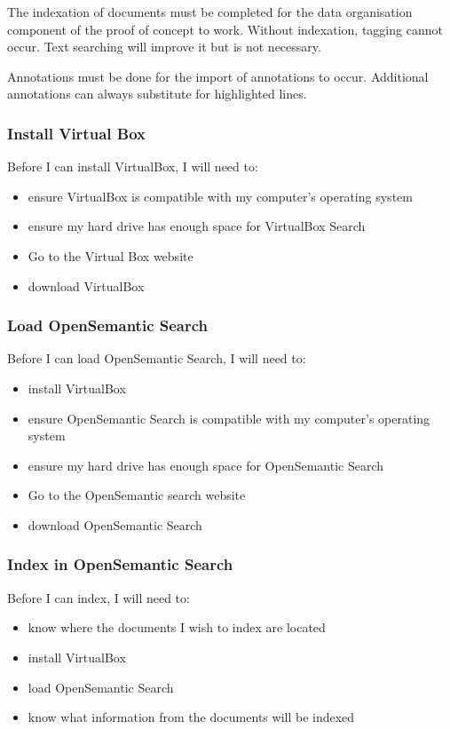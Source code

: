 \documentclass{article}
\begin{document}
The indexation of documents must be completed for the data organisation component of the proof of concept to work. Without indexation, tagging cannot occur. Text searching will improve it but is not necessary.

Annotations must be done for the import of annotations to occur. Additional annotations can always substitute for highlighted lines.

\subsubsection*{Install Virtual Box}

Before I can install VirtualBox, I will need to:
\begin{itemize}
\item ensure VirtualBox is compatible with my computer's operating system
\item ensure my hard drive has enough space for VirtualBox Search
\item Go to the Virtual Box website
\item download VirtualBox
\end{itemize} 

\subsubsection*{Load OpenSemantic Search}

Before I can load OpenSemantic Search, I will need to:\begin{itemize}
\item install VirtualBox
\item ensure OpenSemantic Search is compatible with my computer's operating system
\item ensure my hard drive has enough space for OpenSemantic Search
\item Go to the OpenSemantic search website
\item download OpenSemantic Search
\end{itemize}

\subsubsection*{Index in OpenSemantic Search}

Before I can index, I will need to:\begin{itemize}
\item know where the documents I wish to index are located
\item install VirtualBox
\item load OpenSemantic Search
\item know what information from the documents will be indexed
\end{itemize}
\end{document}
